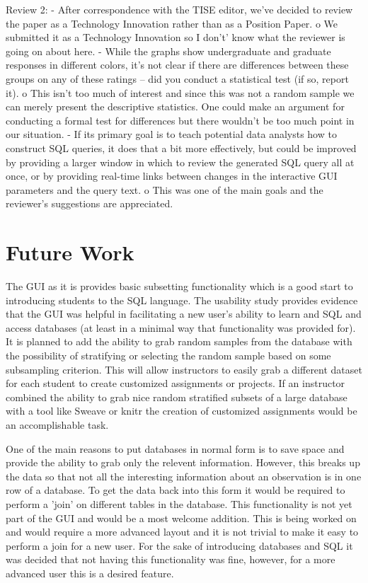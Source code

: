 \documentclass[11pt]{tise_style}
\begin{document}
Review 2:
-	After correspondence with the TISE editor, we’ve decided to review the paper as a Technology Innovation rather than as a Position Paper.
o	We submitted it as a Technology Innovation so I don’t’ know what the reviewer is going on about here.
-	While the graphs show undergraduate and graduate responses in different colors, it’s not clear if there are differences between these groups on any of these ratings – did you conduct a statistical test (if so, report it).
o	This isn’t too much of interest and since this was not a random sample we can merely present the descriptive statistics.  One could make an argument for conducting a formal test for differences but there wouldn’t be too much point in our situation.
-	If its primary goal is to teach potential data analysts how to construct SQL queries, it does that a bit more effectively, but could be improved by providing a larger window in which to review the generated SQL query all at once, or by providing real-time links between changes in the interactive GUI parameters and the query text.
o	This was one of the main goals and the reviewer’s suggestions are appreciated.


\section{{Future Work}}

The GUI as it is provides basic subsetting functionality which is a good start to introducing students to the SQL language.  The usability study provides evidence that the GUI was helpful in facilitating a new user's ability to learn and SQL and access databases (at least in a minimal way that functionality was provided for).  It is planned to add the ability to grab random samples from the database with the possibility of stratifying or selecting the random sample based on some subsampling criterion.  This will allow instructors to easily grab a different dataset for each student to create customized assignments or projects.  If an instructor combined the ability to grab nice random stratified subsets of a large database with a tool like Sweave or knitr \citet{knitr} the creation of customized assignments would be an accomplishable task.

One of the main reasons to put databases in normal form \citet{normalform:1983} is to save space and provide the ability to grab only the relevent information.  However, this breaks up the data so that not all the interesting information about an observation is in one row of a database.  To get the data back into this form it would be required to perform a 'join' on different tables in the database.  This functionality is not yet part of the GUI and would be a most welcome addition.  This is being worked on and would require a more advanced layout and it is not trivial to make it easy to perform a join for a new user.  For the sake of introducing databases and SQL it was decided that not having this functionality was fine, however, for a more advanced user this is a desired feature.


\end{document}
